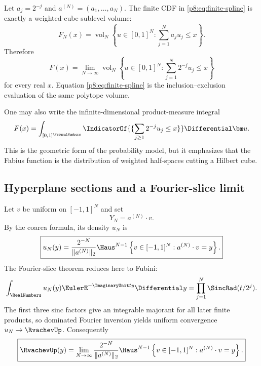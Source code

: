 \documentclass[11pt]{article}
\theoremstyle{definition}
\theoremstyle{remark}
\begin{document}
Let $a_j=2^{-j}$ and $a^{(N)}=(a_1,\ldots,a_N)$.  The finite CDF in
\eqref{p8:eq:finite-spline} is exactly a weighted-cube sublevel volume:
\begin{equation}
 \boxed{\displaystyle
 F_N(x)=\operatorname{vol}_N
 \left\{u\in[0,1]^N:\sum_{j=1}^{N}a_ju_j\le x\right\}.} \label{p8:eq:cube-sublevel}
\end{equation}
Therefore
\begin{equation}
 \boxed{\displaystyle
 F(x)=\lim_{N\to\infty}\operatorname{vol}_N
 \left\{u\in[0,1]^N:\sum_{j=1}^{N}2^{-j}u_j\le x\right\}}              \label{p8:eq:cube-volume-limit}
\end{equation}
for every real $x$.  Equation \eqref{p8:eq:finite-spline} is the
inclusion--exclusion evaluation of the same polytope volume.

One may also write the infinite-dimensional product-measure integral
\begin{equation}
 F(x)=\int_{[0,1]^\NaturalNumbers}
 \IndicatorOf{\{\sum_{j\ge1}2^{-j}u_j\le x\}}\Differential\bm u.  \label{p8:eq:infinite-cube-integral}
\end{equation}
This is the geometric form of the probability model, but it emphasizes that
the Fabius function is the distribution of weighted half-spaces cutting a
Hilbert cube.

\subsection{Hyperplane sections and a Fourier-slice limit}

Let $v$ be uniform on $[-1,1]^N$ and set
\begin{equation}
 Y_N=a^{(N)}\cdot v.
\end{equation}
By the coarea formula, its density $u_N$ is
\begin{equation}
 \boxed{\displaystyle
 u_N(y)=\frac{2^{-N}}{\|a^{(N)}\|_2}
 \Haus^{N-1}
 \left\{v\in[-1,1]^N:a^{(N)}\cdot v=y\right\}.}         \label{p8:eq:cube-section-density}
\end{equation}
The Fourier-slice theorem reduces here to Fubini:
\begin{equation}
 \int_{\RealNumbers}u_N(y)\EulerE^{-\ImaginaryUnit ty}\Differential y
 =\prod_{j=1}^{N}\SincRad(t/2^j).                           \label{p8:eq:cube-fourier-slice}
\end{equation}
The first three sinc factors give an integrable majorant for all later finite
products, so dominated Fourier inversion yields uniform convergence
$u_N\to\RvachevUp$.  Consequently
\begin{equation}
 \boxed{\displaystyle
 \RvachevUp(y)=\lim_{N\to\infty}
 \frac{2^{-N}}{\|a^{(N)}\|_2}
 \Haus^{N-1}
 \left\{v\in[-1,1]^N:a^{(N)}\cdot v=y\right\}.}         \label{p8:eq:cube-section-limit}
\end{equation}
\end{document}
